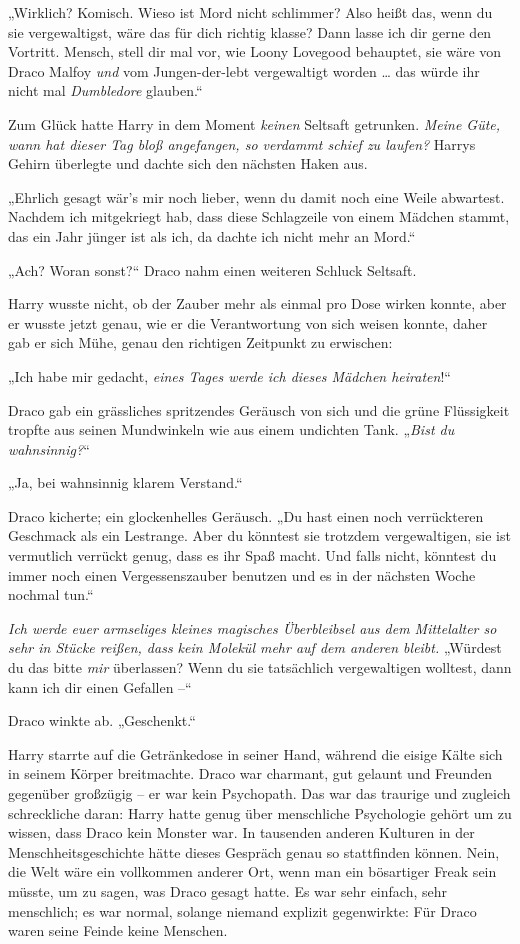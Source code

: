{„Wirklich? Komisch. Wieso ist Mord nicht schlimmer? Also heißt das, wenn du sie vergewaltigst, wäre das für dich richtig klasse? Dann lasse ich dir gerne den Vortritt. Mensch, stell dir mal vor, wie Loony Lovegood behauptet, sie wäre von Draco Malfoy \emph{und} vom Jungen-der-lebt vergewaltigt worden … das würde ihr nicht mal \emph{Dumbledore} glauben.“

Zum Glück hatte Harry in dem Moment \emph{keinen} Seltsaft getrunken. \emph{Meine Güte, wann hat dieser Tag bloß angefangen, so verdammt schief zu laufen?} Harrys Gehirn überlegte und dachte sich den nächsten Haken aus.

„Ehrlich gesagt wär's mir noch lieber, wenn du damit noch eine Weile abwartest. Nachdem ich mitgekriegt hab, dass diese Schlagzeile von einem Mädchen stammt, das ein Jahr jünger ist als ich, da dachte ich nicht mehr an Mord.“

„Ach? Woran sonst?“ Draco nahm einen weiteren Schluck Seltsaft.

Harry wusste nicht, ob der Zauber mehr als einmal pro Dose wirken konnte, aber er wusste jetzt genau, wie er die Verantwortung von sich weisen konnte, daher gab er sich Mühe, genau den richtigen Zeitpunkt zu erwischen:

„Ich habe mir gedacht, \emph{eines Tages werde ich dieses Mädchen heiraten}!“

Draco gab ein grässliches spritzendes Geräusch von sich und die grüne Flüssigkeit tropfte aus seinen Mundwinkeln wie aus einem undichten Tank. „\emph{Bist du wahnsinnig?}“

„Ja, bei wahnsinnig klarem Verstand.“

Draco kicherte; ein glockenhelles Geräusch. „Du hast einen noch verrückteren Geschmack als ein Lestrange. Aber du könntest sie trotzdem vergewaltigen, sie ist vermutlich verrückt genug, dass es ihr Spaß macht. Und falls nicht, könntest du immer noch einen Vergessenszauber benutzen und es in der nächsten Woche nochmal tun.“

\emph{Ich werde euer armseliges kleines magisches Überbleibsel aus dem Mittelalter so sehr in Stücke reißen, dass kein Molekül mehr auf dem anderen bleibt.} „Würdest du das bitte \emph{mir} überlassen? Wenn du sie tatsächlich vergewaltigen wolltest, dann kann ich dir einen Gefallen --“

Draco winkte ab. „Geschenkt.“

Harry starrte auf die Getränkedose in seiner Hand, während die eisige Kälte sich in seinem Körper breitmachte. Draco war charmant, gut gelaunt und Freunden gegenüber großzügig -- er war kein Psychopath. Das war das traurige und zugleich schreckliche daran: Harry hatte genug über menschliche Psychologie gehört um zu wissen, dass Draco kein Monster war. In tausenden anderen Kulturen in der Menschheitsgeschichte hätte dieses Gespräch genau so stattfinden können. Nein, die Welt wäre ein vollkommen anderer Ort, wenn man ein bösartiger Freak sein müsste, um zu sagen, was Draco gesagt hatte. Es war sehr einfach, sehr menschlich; es war normal, solange niemand explizit gegenwirkte: Für Draco waren seine Feinde keine Menschen.

}
